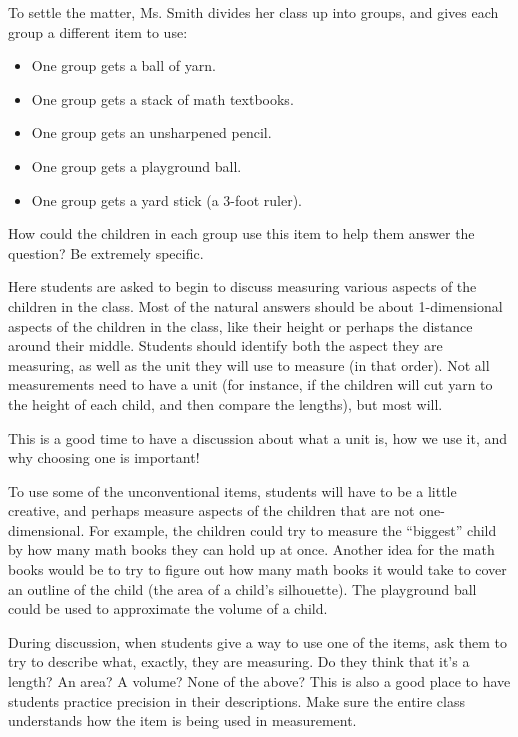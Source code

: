 \documentclass[]{ximera}
\begin{document}
\begin{problem}
    To settle the matter, Ms. Smith divides her class up into groups, and gives each group a different item to use:
    \begin{itemize}
        \item One group gets a ball of yarn.
        \item One group gets a stack of math textbooks.
        \item One group gets an unsharpened pencil.
        \item One group gets a playground ball.
        \item One group gets a yard stick (a 3-foot ruler).
    \end{itemize}
    
    How could the children in each group use this item to help them answer the question?  Be extremely specific.
   
    
    \begin{instructorNotes}
        Here students are asked to begin to discuss measuring various aspects of the children in the class.  Most of the natural answers should be about 1-dimensional aspects of the children in the class, like their height or perhaps the distance around their middle.  Students should identify both the aspect they are measuring, as well as the unit they will use to measure (in that order).  Not all measurements need to have a unit (for instance, if the children will cut yarn to the height of each child, and then compare the lengths), but most will.  
        
        This is a good time to have a discussion about what a unit is, how we use it, and why choosing one is important!
        
        To use some of the unconventional items, students will have to be a little creative, and perhaps measure aspects of the children that are not one-dimensional.  For example, the children could try to measure the ``biggest'' child by how many math books they can hold up at once.  Another idea for the math books would be to try to figure out how many math books it would take to cover an outline of the child (the area of a child's silhouette).  The playground ball could be used to approximate the volume of a child.
        
        During discussion, when students give a way to use one of the items, ask them to try to describe what, exactly, they are measuring.  Do they think that it's a length?  An area?  A volume?  None of the above?  This is also a good place to have students practice precision in their descriptions.  Make sure the entire class understands how the item is being used in measurement.
    \end{instructorNotes}
\end{problem}
\end{document}
